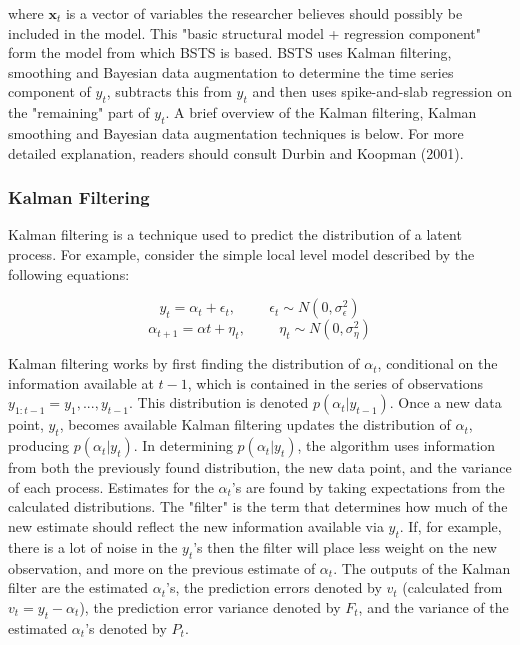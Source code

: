\documentclass[11pt, oneside]{book}   	%
\begin{document}
where $\textbf{x}_{t}$ is a vector of variables the researcher believes should possibly be included in the model. This "basic structural model + regression component" form the model from which BSTS is based. BSTS uses Kalman filtering, smoothing and Bayesian data augmentation to determine the time series component of $y_{t}$, subtracts this from $y_{t}$ and then uses spike-and-slab regression on the "remaining" part of $y_{t}$.  A brief overview of the Kalman filtering, Kalman smoothing and Bayesian data augmentation techniques is below. For more detailed explanation, readers should consult Durbin and Koopman (2001). 

  
 \subsubsection{Kalman Filtering}
 
Kalman filtering is a technique used to predict the distribution of a latent process. For example, consider the simple local level model described by the following equations:

$$ y_{t} = \alpha_{t} + \epsilon_{t},     \hspace{1cm}    \epsilon_{t} \sim N(0, \sigma_{\epsilon}^{2})$$ 
$$ \alpha_{t+1} = \alpha{t} + \eta_{t}, \hspace{1cm}    \eta_{t} \sim N(0, \sigma_{\eta}^{2})$$

Kalman filtering works by first finding the distribution of $\alpha_{t}$, conditional on the information available at $t-1$, which is contained in the series of observations $y_{1:t-1}=y_{1},...,y_{t-1}$. This distribution is denoted $p(\alpha_{t} | y_{t-1})$. Once a new data point, $y_{t}$, becomes available Kalman filtering updates the distribution of $\alpha_{t}$, producing  $p(\alpha_{t} | y_{t})$. In determining  $p(\alpha_{t} | y_{t})$, the algorithm uses information from both the previously found distribution, the new data point, and the variance of each process. Estimates for the $\alpha_t$'s are found by taking  expectations from the calculated distributions. The "filter" is the term that determines how much of the new estimate should reflect the new information available via $y_{t}$. If, for example, there is a lot of noise in the $y_{t}$'s then the filter will place less weight on the new observation, and more on the previous estimate of $\alpha_{t}$. The outputs of the Kalman filter are the estimated $\alpha_{t}$'s, the prediction errors denoted by $v_{t}$ (calculated from $v_{t} = y_{t}-\alpha_{t}$),  the prediction error variance denoted by $F_{t}$, and the variance of the estimated $\alpha_{t}$'s denoted by $P_{t}$.
 
\end{document}
